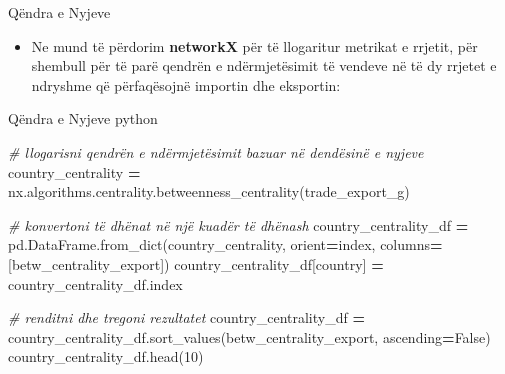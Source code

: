 \documentclass[
  ignorenonframetext,
]{beamer}
\newenvironment{Shaded}{\begin{snugshade}}{\end{snugshade}}
\newcommand{\CommentTok}[1]{\textcolor[rgb]{0.56,0.35,0.01}{\textit{#1}}}
\newcommand{\DecValTok}[1]{\textcolor[rgb]{0.00,0.00,0.81}{#1}}
\newcommand{\NormalTok}[1]{#1}
\newcommand{\OperatorTok}[1]{\textcolor[rgb]{0.81,0.36,0.00}{\textbf{#1}}}
\newcommand{\StringTok}[1]{\textcolor[rgb]{0.31,0.60,0.02}{#1}}
\newcommand{\VariableTok}[1]{\textcolor[rgb]{0.00,0.00,0.00}{#1}}
\providecommand{\tightlist}{%
  \setlength{\itemsep}{0pt}\setlength{\parskip}{0pt}}
\begin{document}
\begin{frame}{Qëndra e Nyjeve}
\protect\hypertarget{quxebndra-e-nyjeve}{}
\begin{itemize}
\tightlist
\item
  Ne mund të përdorim \textbf{networkX} për të llogaritur metrikat e
  rrjetit, për shembull për të parë qendrën e ndërmjetësimit të vendeve
  në të dy rrjetet e ndryshme që përfaqësojnë importin dhe eksportin:
\end{itemize}
\end{frame}

\begin{frame}[fragile]{Qëndra e Nyjeve}
\protect\hypertarget{quxebndra-e-nyjeve-1}{}
python

\begin{Shaded}
\begin{Highlighting}[]
\CommentTok{\# llogarisni qendrën e ndërmjetësimit bazuar në dendësinë e nyjeve}
\NormalTok{country\_centrality }\OperatorTok{=}\NormalTok{ nx.algorithms.centrality.betweenness\_centrality(trade\_export\_g)}

\CommentTok{\# konvertoni të dhënat në një kuadër të dhënash}
\NormalTok{country\_centrality\_df }\OperatorTok{=}\NormalTok{ pd.DataFrame.from\_dict(country\_centrality, }
\NormalTok{                                orient}\OperatorTok{=}\StringTok{\textquotesingle{}index\textquotesingle{}}\NormalTok{, columns}\OperatorTok{=}\NormalTok{[}\StringTok{\textquotesingle{}betw\_centrality\_export\textquotesingle{}}\NormalTok{])}
\NormalTok{country\_centrality\_df[}\StringTok{\textquotesingle{}country\textquotesingle{}}\NormalTok{] }\OperatorTok{=}\NormalTok{ country\_centrality\_df.index}

\CommentTok{\# renditni dhe tregoni rezultatet}
\NormalTok{country\_centrality\_df }\OperatorTok{=}\NormalTok{ country\_centrality\_df.sort\_values(}\StringTok{\textquotesingle{}betw\_centrality\_export\textquotesingle{}}\NormalTok{, ascending}\OperatorTok{=}\VariableTok{False}\NormalTok{)}
\NormalTok{country\_centrality\_df.head(}\DecValTok{10}\NormalTok{)}
\end{Highlighting}
\end{Shaded}
\end{frame}
\end{document}
